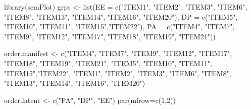 \documentclass[
]{article}
\newenvironment{Shaded}{\begin{snugshade}}{\end{snugshade}}
\newcommand{\AttributeTok}[1]{\textcolor[rgb]{0.77,0.63,0.00}{#1}}
\newcommand{\DecValTok}[1]{\textcolor[rgb]{0.00,0.00,0.81}{#1}}
\newcommand{\FunctionTok}[1]{\textcolor[rgb]{0.00,0.00,0.00}{#1}}
\newcommand{\NormalTok}[1]{#1}
\newcommand{\OtherTok}[1]{\textcolor[rgb]{0.56,0.35,0.01}{#1}}
\newcommand{\StringTok}[1]{\textcolor[rgb]{0.31,0.60,0.02}{#1}}
\begin{document}
\begin{Shaded}
\begin{Highlighting}[]
\FunctionTok{library}\NormalTok{(semPlot)}
\NormalTok{grps }\OtherTok{\textless{}{-}} \FunctionTok{list}\NormalTok{(}\AttributeTok{EE =} \FunctionTok{c}\NormalTok{(}\StringTok{"ITEM1"}\NormalTok{, }\StringTok{"ITEM2"}\NormalTok{, }\StringTok{"ITEM3"}\NormalTok{, }\StringTok{"ITEM6"}\NormalTok{, }\StringTok{"ITEM8"}\NormalTok{, }
        \StringTok{"ITEM13"}\NormalTok{, }\StringTok{"ITEM14"}\NormalTok{,  }\StringTok{"ITEM16"}\NormalTok{, }\StringTok{"ITEM20"}\NormalTok{), }
        \AttributeTok{DP =} \FunctionTok{c}\NormalTok{(}\StringTok{"ITEM5"}\NormalTok{, }\StringTok{"ITEM10"}\NormalTok{, }\StringTok{"ITEM11"}\NormalTok{, }\StringTok{"ITEM15"}\NormalTok{,}\StringTok{"ITEM22"}\NormalTok{),}
        \AttributeTok{PA =} \FunctionTok{c}\NormalTok{(}\StringTok{"ITEM4"}\NormalTok{, }\StringTok{"ITEM7"}\NormalTok{, }\StringTok{"ITEM9"}\NormalTok{, }\StringTok{"ITEM12"}\NormalTok{,}
               \StringTok{"ITEM17"}\NormalTok{, }\StringTok{"ITEM18"}\NormalTok{, }\StringTok{"ITEM19"}\NormalTok{, }\StringTok{"ITEM21"}\NormalTok{))}

\NormalTok{order.manifest }\OtherTok{\textless{}{-}} \FunctionTok{c}\NormalTok{(}\StringTok{"ITEM4"}\NormalTok{, }\StringTok{"ITEM7"}\NormalTok{, }\StringTok{"ITEM9"}\NormalTok{, }\StringTok{"ITEM12"}\NormalTok{,}
        \StringTok{"ITEM17"}\NormalTok{, }\StringTok{"ITEM18"}\NormalTok{, }\StringTok{"ITEM19"}\NormalTok{, }\StringTok{"ITEM21"}\NormalTok{,}
        \StringTok{"ITEM5"}\NormalTok{, }\StringTok{"ITEM10"}\NormalTok{, }\StringTok{"ITEM11"}\NormalTok{, }\StringTok{"ITEM15"}\NormalTok{,}\StringTok{"ITEM22"}\NormalTok{,}
        \StringTok{"ITEM1"}\NormalTok{, }\StringTok{"ITEM2"}\NormalTok{, }\StringTok{"ITEM3"}\NormalTok{, }\StringTok{"ITEM6"}\NormalTok{, }\StringTok{"ITEM8"}\NormalTok{, }
        \StringTok{"ITEM13"}\NormalTok{, }\StringTok{"ITEM14"}\NormalTok{,  }\StringTok{"ITEM16"}\NormalTok{, }\StringTok{"ITEM20"}\NormalTok{)}

\NormalTok{order.latent }\OtherTok{\textless{}{-}} \FunctionTok{c}\NormalTok{(}\StringTok{"PA"}\NormalTok{, }\StringTok{"DP"}\NormalTok{, }\StringTok{"EE"}\NormalTok{)}
\FunctionTok{par}\NormalTok{(}\AttributeTok{mfrow=}\FunctionTok{c}\NormalTok{(}\DecValTok{1}\NormalTok{,}\DecValTok{2}\NormalTok{))}


\end{Highlighting}
\end{Shaded}
\end{document}

